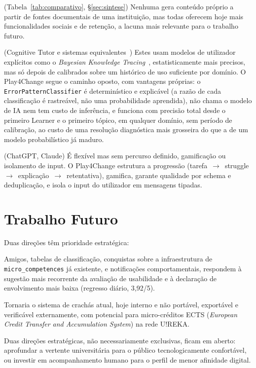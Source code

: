 \begin{description}[style=nextline, font=\bfseries]

\item[Face às plataformas gamificadas]
(Tabela~\ref{tab:comparativo}, §\ref{sec:sintese}) Nenhuma gera conteúdo próprio a partir de fontes documentais de uma instituição, mas todas oferecem hoje mais funcionalidades sociais e de retenção, a lacuna mais relevante para o trabalho futuro.

\item[Face aos ITS clássicos]
(Cognitive Tutor e sistemas equivalentes~\cite{vanlehn2011}) Estes usam modelos de utilizador explícitos como o \textit{Bayesian Knowledge Tracing}~\cite{corbett1994}, estatisticamente mais precisos, mas só depois de calibrados sobre um histórico de uso suficiente por domínio. O Play4Change segue o caminho oposto, com vantagens próprias: o \texttt{ErrorPatternClassifier} é determinístico e explicável (a razão de cada classificação é rastreável, não uma probabilidade aprendida), não chama o modelo de IA nem tem custo de inferência, e funciona com precisão total desde o primeiro Learner e o primeiro tópico, em qualquer domínio, sem período de calibração, ao custo de uma resolução diagnóstica mais grosseira do que a de um modelo probabilístico já maduro.

\item[Face ao uso direto de LLM para tutoria]
(ChatGPT, Claude) É flexível mas sem percurso definido, gamificação ou isolamento de input. O Play4Change estrutura a progressão (tarefa~$\to$~struggle~$\to$~explicação~$\to$~retentativa), gamifica, garante qualidade por schema e deduplicação, e isola o input do utilizador em mensagens tipadas.

\end{description}

\section{Trabalho Futuro} \label{sec:trabalho-futuro}

Duas direções têm prioridade estratégica:

\begin{description}[style=nextline, font=\bfseries]

\item[Funcionalidades sociais e de retenção]
Amigos, tabelas de classificação, conquistas sobre a infraestrutura de \texttt{micro\_competences} já existente, e notificações comportamentais, respondem à sugestão mais recorrente da avaliação de usabilidade e à declaração de envolvimento mais baixa (regresso diário, 3,92/5).

\item[Reconhecimento formal via Open Badges e créditos ECTS]
Tornaria o sistema de crachás atual, hoje interno e não portável, exportável e verificável externamente, com potencial para micro-créditos ECTS (\textit{European Credit Transfer and Accumulation System}) na rede U!REKA.

\end{description}

Duas direções estratégicas, não necessariamente exclusivas, ficam em aberto: aprofundar a vertente universitária para o público tecnologicamente confortável, ou investir em acompanhamento humano para o perfil de menor afinidade digital.

